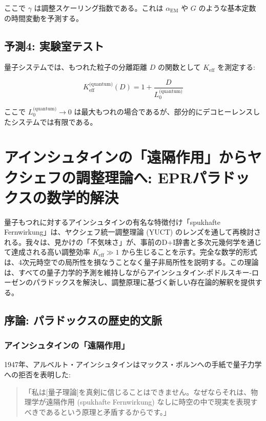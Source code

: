 \documentclass[11pt,a4paper]{article}
\begin{document}
	ここで $\gamma$ は調整スケーリング指数である。これは $\alpha_{\text{EM}}$ や $G$ のような基本定数の時間変動を予測する。
	
	\subsection{予測4: 実験室テスト}
	
	量子システムでは、もつれた粒子の分離距離 $D$ の関数として $K_{\mathrm{eff}}$ を測定する:
	
	\begin{equation}
		K_{\mathrm{eff}}^{\text{(quantum)}}(D) = 1 + \frac{D}{L_0^{\text{(quantum)}}}
	\end{equation}
	
	ここで $L_0^{\text{(quantum)}} \to 0$ は最大もつれの場合であるが、部分的にデコヒーレンスしたシステムでは有限である。
	
	\section{アインシュタインの「遠隔作用」からヤクシェフの調整理論へ: EPRパラドックスの数学的解決}
	\label{sec:einstein-paradox}
	
	量子もつれに対するアインシュタインの有名な特徴付け「spukhafte Fernwirkung」は、ヤクシェフ統一調整理論 (YUCT) のレンズを通して再検討される。我々は、見かけの「不気味さ」が、事前のD+I辞書と多次元幾何学を通じて達成される高い調整効率 $K_{\mathrm{eff}} \gg 1$ から生じることを示す。完全な数学的形式は、4次元時空での局所性を損なうことなく量子非局所性を説明する。この理論は、すべての量子力学的予測を維持しながらアインシュタイン-ポドルスキー-ローゼンのパラドックスを解決し、調整原理に基づく新しい存在論的解釈を提供する。
	
	\subsection{序論: パラドックスの歴史的文脈}
	\label{subsec:einstein-historical}
	
	\subsubsection{アインシュタインの「遠隔作用」}
	1947年、アルベルト・アインシュタインはマックス・ボルンへの手紙で量子力学への拒否を表明した:
	
	\begin{quote}
		「私は[量子理論]を真剣に信じることはできません。なぜならそれは、物理学が遠隔作用 (spukhafte Fernwirkung) なしに時空の中で現実を表現すべきであるという原理と矛盾するからです。」
	\end{quote}
	
\end{document}
